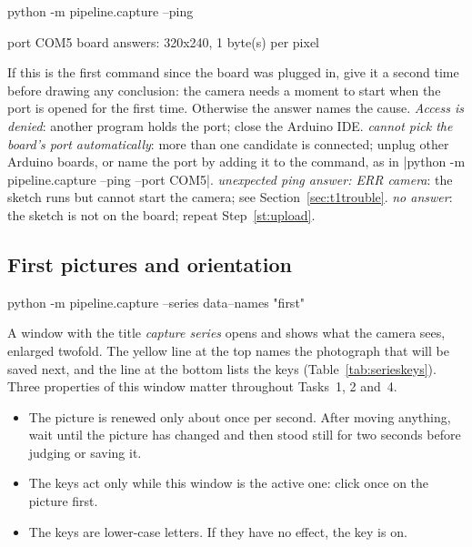 \label{st:ping}
\begin{ps}
python -m pipeline.capture --ping
\end{ps}
\begin{out}
port COM5
board answers: 320x240, 1 byte(s) per pixel
\end{out}

\begin{iffail}
If this is the first command since the board was plugged in, give it a second time before
drawing any conclusion: the camera needs a moment to start when the port is opened for the
first time. Otherwise the answer names the cause. \emph{Access is denied}: another program
holds the port; close the Arduino IDE. \emph{cannot pick the board's port automatically}: more than one candidate is
connected; unplug other Arduino boards, or name the port by adding it to the command, as in
\code|python -m pipeline.capture --ping --port COM5|. \emph{unexpected ping answer: ERR
camera}: the sketch runs but cannot start the camera; see Section~\ref{sec:t1trouble}.
\emph{no answer}: the sketch is not on the board; repeat Step~\ref{st:upload}.
\end{iffail}

\subsection{First pictures and orientation}

\label{st:viewfinder}
\begin{ps}
python -m pipeline.capture --series data\raw\rig --names "first"
\end{ps}
A window with the title \emph{capture series} opens and shows what the camera sees, enlarged
twofold. The yellow line at the top names the photograph that will be saved next, and the line
at the bottom lists the keys (Table~\ref{tab:serieskeys}). Three properties of this window
matter throughout Tasks~1, 2 and~4.
\begin{itemize}
\item The picture is renewed only about once per second. After moving anything, wait until the
  picture has changed and then stood still for two seconds before judging or saving it.
\item The keys act only while this window is the active one: click once on the picture first.
\item The keys are lower-case letters. If they have no effect, the  key is on.
\end{itemize}

